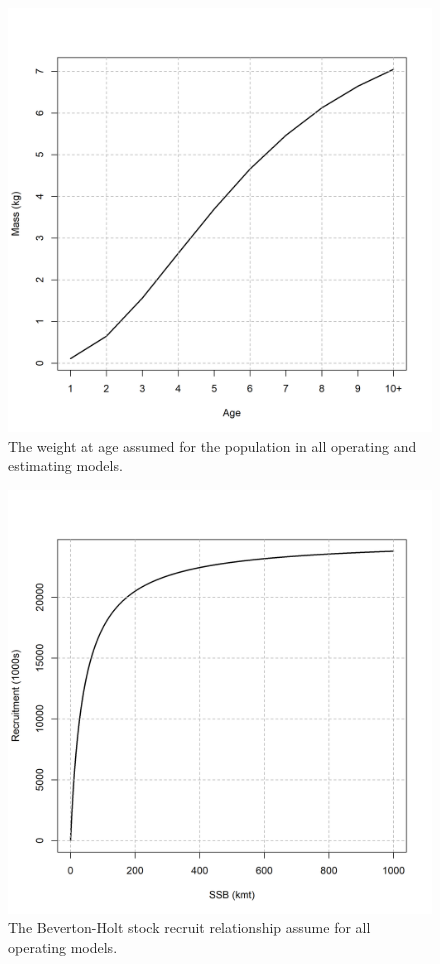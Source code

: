 \documentclass[
  12pt,
]{article}
\begin{document}
\begin{figure}
\caption{The weight at age assumed for the population in all operating and estimating models.}\label{om_waa}
\begin{center}
\includegraphics[width = \textwidth]{om_waa.png}
\end{center}
\end{figure}

\begin{figure}
\caption{The Beverton-Holt stock recruit relationship assume for all operating models.}\label{om_sr}
\begin{center}
\includegraphics[width = \textwidth]{om_sr.png}
\end{center}
\end{figure}
\end{document}
